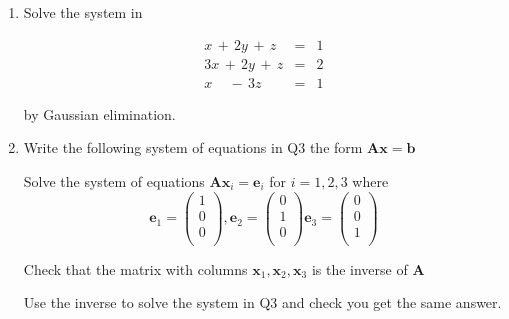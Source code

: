 \documentclass[11pt,a4paper]{article}
\def\bA{\mathbf{A}}
\def\bb{\mathbf{b}}
\def\bx{\mathbf{x}}
\begin{document}
\begin{enumerate}
.

%


\item Solve the system in 

\begin{eqnarray*}
	x\,+\,2y\,+\,z&=&1\\
	3x\,+\,2y\,+\,z&=&2\\
	x\,\,\,\,\,\,\,-\,3z&=&1
\end{eqnarray*}


 by Gaussian elimination.


%



\item Write the following system of equations in Q3  the form $\bA\bx=\bb$

Solve the system of equations $\bA \bx_i =\mathbf{e}_i$ for $i=1,2,3$ where 
\[
\mathbf{e}_1=
\left(
\begin{array}{c}
1   \\
0  \\
0  \\
\end{array}
\right),
\mathbf{e}_2=
\left(
\begin{array}{c}
0   \\
1  \\
0  \\
\end{array}
\right)
\mathbf{e}_3=
\left(
\begin{array}{c}
0   \\
0  \\
1  \\
\end{array}
\right)
\]

Check that the matrix with columns $\bx_1,\bx_2,\bx_3$ is the inverse of $\bA$

Use the inverse to solve the system in Q3 and check you get the same answer.

\end{enumerate}
\end{document}
